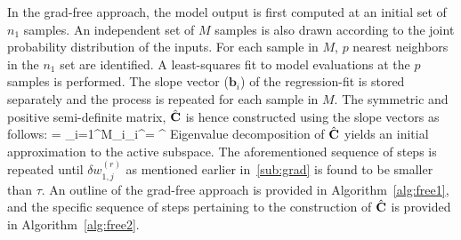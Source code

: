 In the grad-free approach, the model output is first computed at an initial set of $n_1$ samples. An independent
set of $M$ samples is also drawn according to the joint probability distribution of the inputs. For each sample
in $M$, $p$ nearest neighbors in the $n_1$ set are identified. A least-squares fit to model evaluations at
the $p$ samples is performed. The slope vector ($\bm{b}_i$) of the regression-fit is stored separately and the process is
repeated for each sample in $M$. The symmetric and positive semi-definite matrix, $\hat{\mathbf{{C}}}$ is hence constructed
using the slope vectors as follows:
%
\be
{} = \sum\limits_{i=1}^{M}_i_i^\top = \hat{\bm{\Lambda}}^\top
\ee
%
Eigenvalue decomposition of $\hat{\mathbf{{C}}}$ yields an initial approximation to the
active subspace. The aforementioned sequence of steps is repeated until $\delta w_{1,j}^{(r)}$ as mentioned
earlier in~\ref{sub:grad} is found to be smaller than $\tau$. An outline of the grad-free approach is
provided in Algorithm~\ref{alg:free1}, and the specific sequence of steps pertaining to the construction of
$\hat{\mathbf{{C}}}$ is provided in Algorithm~\ref{alg:free2}.
 


